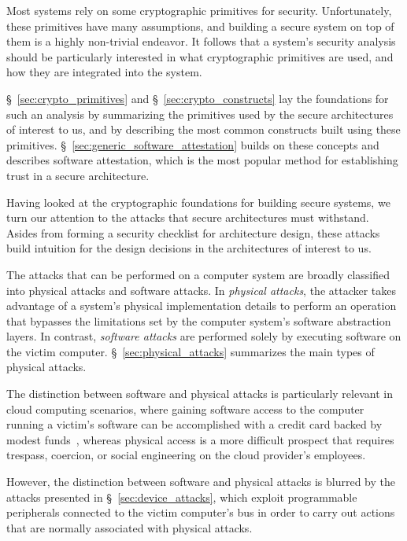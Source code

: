 \label{sec:security_background}

Most systems rely on some cryptographic primitives for security. Unfortunately,
these primitives have many assumptions, and building a secure system on top of
them is a highly non-trivial endeavor. It follows that a system's security
analysis should be particularly interested in what cryptographic primitives are
used, and how they are integrated into the system.

\S~\ref{sec:crypto_primitives} and \S~\ref{sec:crypto_constructs} lay the
foundations for such an analysis by summarizing the primitives used by the
secure architectures of interest to us, and by describing the most
common constructs built using these primitives.
\S~\ref{sec:generic_software_attestation} builds on these concepts and
describes software attestation, which is the most popular method for
establishing trust in a secure architecture.

Having looked at the cryptographic foundations for building secure systems, we
turn our attention to the attacks that secure architectures must withstand.
Asides from forming a security checklist for architecture design, these attacks
build intuition for the design decisions in the architectures of interest to us.

The attacks that can be performed on a computer system are broadly classified
into physical attacks and software attacks. In \textit{physical attacks}, the
attacker takes advantage of a system's physical implementation details to
perform an operation that bypasses the limitations set by the computer
system's software abstraction layers. In contrast, \textit{software attacks}
are performed solely by executing software on the victim computer.
\S~\ref{sec:physical_attacks} summarizes the main types of physical attacks.

The distinction between software and physical attacks is particularly relevant
in cloud computing scenarios, where gaining software access to the computer
running a victim's software can be accomplished with a credit card backed by
modest funds~\cite{ristenpart2009colocation}, whereas physical access is a
more difficult prospect that requires trespass, coercion, or social engineering
on the cloud provider's employees.

However, the distinction between software and physical attacks is blurred by
the attacks presented in \S~\ref{sec:device_attacks}, which exploit
programmable peripherals connected to the victim computer's bus in order to
carry out actions that are normally associated with physical attacks.


